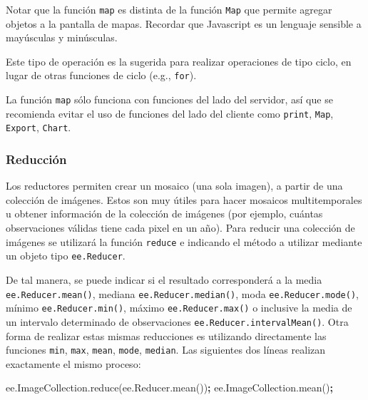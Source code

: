 \documentclass[
]{article}
\newenvironment{Shaded}{\begin{snugshade}}{\end{snugshade}}
\newcommand{\AttributeTok}[1]{\textcolor[rgb]{0.77,0.63,0.00}{#1}}
\newcommand{\NormalTok}[1]{#1}
\newcommand{\OperatorTok}[1]{\textcolor[rgb]{0.81,0.36,0.00}{\textbf{#1}}}
\newcommand{\VariableTok}[1]{\textcolor[rgb]{0.00,0.00,0.00}{#1}}
\begin{document}
\begin{tipblock}
Notar que la función \texttt{map} es distinta de la función \texttt{Map}
que permite agregar objetos a la pantalla de mapas. Recordar que
Javascript es un lenguaje sensible a mayúsculas y minúsculas.

\end{tipblock}

Este tipo de operación es la sugerida para realizar operaciones de tipo
ciclo, en lugar de otras funciones de ciclo (e.g., \texttt{for}).

\begin{tipblock}
La función \texttt{map} sólo funciona con funciones del lado del
servidor, así que se recomienda evitar el uso de funciones del lado del
cliente como \texttt{print}, \texttt{Map}, \texttt{Export},
\texttt{Chart}.

\end{tipblock}

\hypertarget{reducciuxf3n}{%
\subsubsection{Reducción}\label{reducciuxf3n}}

Los reductores permiten crear un mosaico (una sola imagen), a partir de
una colección de imágenes. Estos son muy útiles para hacer mosaicos
multitemporales u obtener información de la colección de imágenes (por
ejemplo, cuántas observaciones válidas tiene cada pixel en un año). Para
reducir una colección de imágenes se utilizará la función
\texttt{reduce} e indicando el método a utilizar mediante un objeto tipo
\texttt{ee.Reducer}.

De tal manera, se puede indicar si el resultado corresponderá a la media
\texttt{ee.Reducer.mean()}, mediana \texttt{ee.Reducer.median()}, moda
\texttt{ee.Reducer.mode()}, mínimo \texttt{ee.Reducer.min()}, máximo
\texttt{ee.Reducer.max()} o inclusive la media de un intervalo
determinado de observaciones \texttt{ee.Reducer.intervalMean()}. Otra
forma de realizar estas mismas reducciones es utilizando directamente
las funciones \texttt{min}, \texttt{max}, \texttt{mean}, \texttt{mode},
\texttt{median}. Las siguientes dos líneas realizan exactamente el mismo
proceso:

\begin{Shaded}
\begin{Highlighting}[]
\VariableTok{ee}\NormalTok{.}\VariableTok{ImageCollection}\NormalTok{.}\AttributeTok{reduce}\NormalTok{(}\VariableTok{ee}\NormalTok{.}\VariableTok{Reducer}\NormalTok{.}\AttributeTok{mean}\NormalTok{())}\OperatorTok{;}
\VariableTok{ee}\NormalTok{.}\VariableTok{ImageCollection}\NormalTok{.}\AttributeTok{mean}\NormalTok{()}\OperatorTok{;}
\end{Highlighting}
\end{Shaded}
\end{document}
